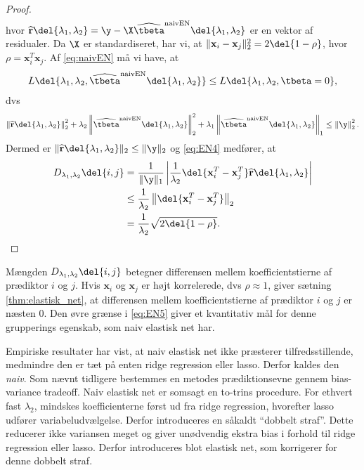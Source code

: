 \begin{proof}
\begin{align}
\end{align}
hvor \(\widehat{\mathbf{r}}\del{\lambda_1, \lambda_2} = \y - \X  \widehat{\tbeta}^\text{naivEN} \del{\lambda_1, \lambda_2}\) er en vektor af residualer.
Da \(\X\) er standardiseret, har vi, at \(\Vert \mathbf{x}_i - \mathbf{x}_j \Vert_2^2=2 \del{1-\rho}\), hvor \(\rho = \mathbf{x}_i^T \mathbf{x}_j\).
Af \eqref{eq:naivEN} må vi have, at
\begin{align*}
L \del{\lambda_1,\lambda_2, \widehat{\tbeta}^\text{naivEN} \del{\lambda_1, \lambda_2}} \leq L \del{\lambda_1,\lambda_2, \tbeta = 0},  
\end{align*}
dvs
\begin{align*}
\left\Vert \widehat{\mathbf{r}} \del{\lambda_1, \lambda_2} \right\Vert_2^2 + \lambda_2 \left\Vert \widehat{\tbeta}^\text{naivEN} \del{\lambda_1, \lambda_2} \right\Vert_2^2 + \lambda_1 \left\Vert \widehat{\tbeta}^\text{naivEN} \del{\lambda_1, \lambda_2} \right\Vert_1 \leq \left\Vert \y \right\Vert_2^2.  
\end{align*}
Dermed er \(\Vert \widehat{\mathbf{r}} \del{\lambda_1, \lambda_2} \Vert_2 \leq \Vert \y \Vert_2\) og \eqref{eq:EN4} medfører, at
\begin{align*}
D_{\lambda_1, \lambda_2} \del{i,j} &= \frac{1}{\Vert \y \Vert_1} \left\vert \frac{1}{\lambda_2} \del{\mathbf{x}_i^T-\mathbf{x}_j^T} \widehat{\mathbf{r}}\del{\lambda_1, \lambda_2} \right\vert \\ 
&\leq \frac{1}{\lambda_2} \left\Vert \del{\mathbf{x}_i^T-\mathbf{x}_j^T} \right\Vert_2 \\ 
&= \frac{1}{\lambda_2} \sqrt{2 \del{1-\rho}}.
\end{align*}
\end{proof}
%
Mængden \(D_{\lambda_1, \lambda_2} \del{i,j}\) betegner differensen mellem koefficientstierne af prædiktor \(i\) og \(j\).
Hvis \(\mathbf{x}_i\) og \(\mathbf{x}_j\) er højt korrelerede, dvs \(\rho \approx 1\), giver sætning \ref{thm:elastisk_net}, at differensen mellem koefficientstierne af prædiktor \(i\) og \(j\) er næsten 0.
Den øvre grænse i \eqref{eq:EN5} giver et kvantitativ mål for denne grupperings egenskab, som naiv elastisk net har.

Empiriske resultater har vist, at naiv elastisk net ikke præsterer tilfredsstillende, medmindre den er tæt på enten ridge regression eller lasso.
Derfor kaldes den \textit{naiv}.
Som nævnt tidligere bestemmes en metodes prædiktionsevne gennem bias-variance tradeoff. 
Naiv elastisk net er somsagt en to-trins procedure. 
For ethvert fast \(\lambda_2\), mindskes koefficienterne først ud fra ridge regression, hvorefter lasso udfører variabeludvælgelse.
Derfor introduceres en såkaldt ``dobbelt straf''.
Dette reducerer ikke variansen meget og giver unødvendig ekstra bias i forhold til ridge regression eller lasso.
Derfor introduceres blot elastisk net, som korrigerer for denne dobbelt straf.

